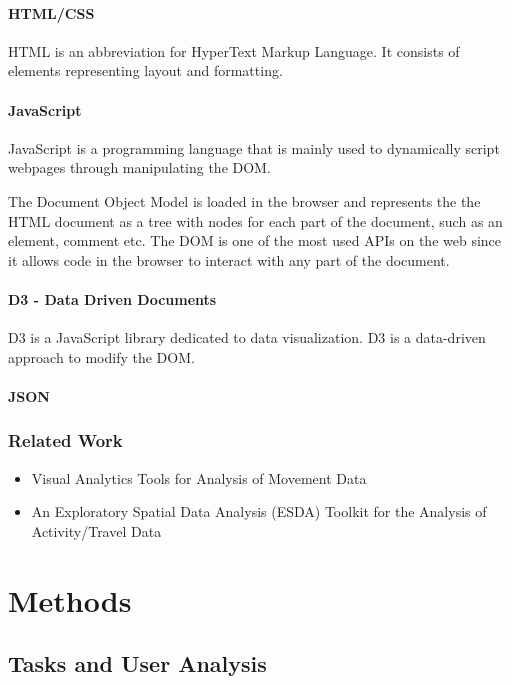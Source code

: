 \documentclass{kththesis}
\begin{document}
\subsubsection{HTML/CSS}
HTML is an abbreviation for HyperText Markup Language. It consists of elements representing layout and formatting.

\subsubsection{JavaScript}
JavaScript is a programming language that is mainly used to dynamically script webpages through manipulating the DOM. \cite{JS}

The Document Object Model is loaded in the browser and represents the the HTML document as a tree with nodes for each part of the document, such as an element, comment etc. \cite{DOM}
The DOM is one of the most used APIs on the web since it allows code in the browser to interact with any part of the document.

\subsubsection{D3 - Data Driven Documents}
D3 is a JavaScript library dedicated to data visualization. D3 is a data-driven approach to modify the DOM. \cite{D3}

\subsubsection{JSON}

\subsection{Related Work}
 \begin{itemize}
     \item Visual Analytics Tools for Analysis of Movement Data
     \item An Exploratory Spatial Data Analysis (ESDA) Toolkit for the Analysis of Activity/Travel Data
 \end{itemize}


\chapter{Methods}

\section{Tasks and User Analysis}
\end{document}
